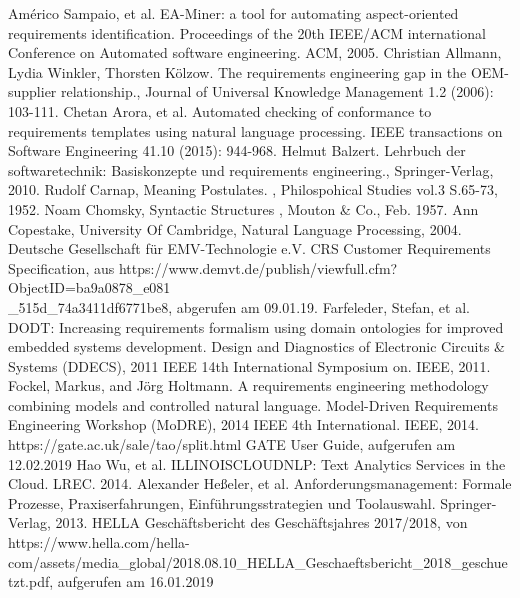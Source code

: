\documentclass[12pt]{report}
\begin{document}
\newpage
\begin{thebibliography}{20}
Américo Sampaio, et al. \glqq EA-Miner: a tool for automating aspect-oriented requirements identification.\grqq{} Proceedings of the 20th IEEE/ACM international Conference on Automated software engineering. ACM, 2005.
 Christian Allmann, Lydia Winkler, Thorsten Kölzow. \glqq The requirements engineering gap in the OEM-supplier relationship.\grqq , Journal of Universal Knowledge Management 1.2 (2006): 103-111.
Chetan Arora, et al. \glqq Automated checking of conformance to requirements templates using natural language processing.\grqq{} IEEE transactions on Software Engineering 41.10 (2015): 944-968.
Helmut Balzert. \glqq Lehrbuch der softwaretechnik: Basiskonzepte und requirements engineering.\grqq , Springer-Verlag, 2010.
Rudolf Carnap, \glqq  Meaning Postulates.\grqq{} , Philospohical Studies vol.3 S.65-73, 1952.
 Noam Chomsky, \glqq  Syntactic Structures\grqq{} , Mouton \& Co., Feb. 1957.
Ann Copestake, University Of Cambridge, \glqq Natural Language Processing\grqq , 2004.
 Deutsche Gesellschaft für EMV-Technologie e.V. \glqq CRS Customer Requirements Specification\grqq, aus https://www.demvt.de/publish/viewfull.cfm?ObjectID=ba9a0878\_e081\\ \_515d\_74a3411df6771be8, abgerufen am 09.01.19.
 Farfeleder, Stefan, et al. \glqq DODT: Increasing requirements formalism using domain ontologies for improved embedded systems development. \grqq{} Design and Diagnostics of Electronic Circuits \& Systems (DDECS), 2011 IEEE 14th International Symposium on. IEEE, 2011.
 Fockel, Markus, and Jörg Holtmann. \glqq A requirements engineering methodology combining models and controlled natural language.\grqq{} Model-Driven Requirements Engineering Workshop (MoDRE), 2014 IEEE 4th International. IEEE, 2014.
 https://gate.ac.uk/sale/tao/split.html GATE User Guide, aufgerufen am 12.02.2019
 Hao Wu, et al. \glqq  ILLINOISCLOUDNLP: Text Analytics Services in the Cloud.\grqq{}  LREC. 2014.
 Alexander Heßeler, et al. \glqq Anforderungsmanagement: Formale Prozesse, Praxiserfahrungen, Einführungsstrategien und Toolauswahl.\grqq{} Springer-Verlag, 2013.
 HELLA Geschäftsbericht des Geschäftsjahres 2017/2018, von https://www.hella.com/hella-com/assets/media\_global/2018.08.10\_HELLA\_Geschaeftsbericht\_2018\_geschuetzt.pdf, aufgerufen am 16.01.2019

\end{thebibliography}
\end{document}
